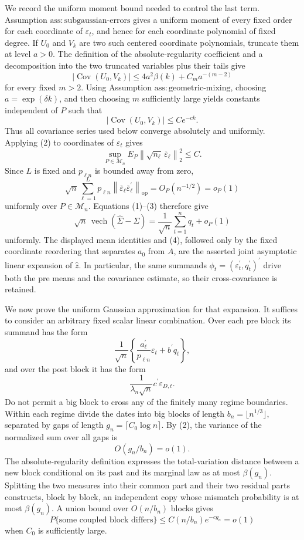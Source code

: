 We record the uniform moment bound needed to control the last term.  Assumption \(\mathrm{ass:subgaussian\mbox{-}errors}\) gives a uniform moment of every fixed order for each coordinate of \(\varepsilon_t\), and hence for each coordinate polynomial of fixed degree.  If \(U_0\) and \(V_k\) are two such centered coordinate polynomials, truncate them at level \(a>0\).  The definition of the absolute-regularity coefficient and a decomposition into the two truncated variables plus their tails give
\[
|\operatorname{Cov}(U_0,V_k)|
\leq 4a^2\beta(k)
+C_m a^{-(m-2)}
\]
for every fixed \(m>2\).  Using Assumption \(\mathrm{ass:geometric\mbox{-}mixing}\), choosing \(a=\exp(\delta k)\), and then choosing \(m\) sufficiently large yields constants independent of \(P\) such that
\[
|\operatorname{Cov}(U_0,V_k)|\leq C e^{-ck}.
\tag{2}
\]
Thus all covariance series used below converge absolutely and uniformly.  Applying (2) to coordinates of \(\varepsilon_t\) gives
\[
\sup_{P\in\mathcal M_n}
E_P\left\|\sqrt{n_\ell}\,\overline\varepsilon_\ell\right\|_2^2
\leq C.
\]
Since \(L\) is fixed and \(p_{\ell n}\) is bounded away from zero,
\[
\sqrt n\sum_{\ell=1}^{L}p_{\ell n}
\left\|\overline\varepsilon_\ell
\overline\varepsilon_\ell^{\prime}\right\|_{\mathrm{op}}
=O_P(n^{-1/2})=o_P(1)
\tag{3}
\]
uniformly over \(P\in\mathcal M_n\).  Equations (1)--(3) therefore give
\[
\sqrt n\,\operatorname{vech}(\widehat\Sigma-\Sigma)
=\frac1{\sqrt n}\sum_{t=1}^{n}q_t+o_P(1)
\tag{4}
\]
uniformly.  The displayed mean identities and (4), followed only by the fixed coordinate reordering that separates \(a_0\) from \(A\), are the asserted joint asymptotic linear expansion of \(\widehat z\).  In particular, the same summands \(\phi_t=(\varepsilon_t^{\prime},q_t^{\prime})^{\prime}\) drive both the pre means and the covariance estimate, so their cross-covariance is retained.

We now prove the uniform Gaussian approximation for that expansion.  It suffices to consider an arbitrary fixed scalar linear combination.  Over each pre block its summand has the form
\[
\frac1{\sqrt n}
\left\{\frac{a_\ell^{\prime}}{p_{\ell n}}\varepsilon_t
+b^{\prime}q_t\right\},
\]
and over the post block it has the form
\[
\frac1{\lambda_n\sqrt n}c^{\prime}\varepsilon_{D,t}.
\]
Do not permit a big block to cross any of the finitely many regime boundaries.  Within each regime divide the dates into big blocks of length \(b_n=\lfloor n^{1/3}\rfloor\), separated by gaps of length \(g_n=\lceil C_0\log n\rceil\).  By (2), the variance of the normalized sum over all gaps is
\[
O(g_n/b_n)=o(1).
\tag{5}
\]
The absolute-regularity definition expresses the total-variation distance between a new block conditional on its past and its marginal law as at most \(\beta(g_n)\).  Splitting the two measures into their common part and their two residual parts constructs, block by block, an independent copy whose mismatch probability is at most \(\beta(g_n)\).  A union bound over \(O(n/b_n)\) blocks gives
\[
P\{\text{some coupled block differs}\}
\leq C(n/b_n)e^{-c g_n}=o(1)
\tag{6}
\]
when \(C_0\) is sufficiently large.

